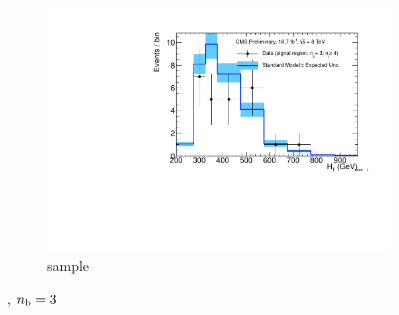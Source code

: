 \begin{figure}[h!]
\begin{subfigure}[b]{0.48\textwidth}
    \includegraphics[width=\textwidth,page=4]
    {Figs/results/v0/blueBand/bestFit_2012dev_RQcdZero_fZinvAll_3b_ge4j-1h_smOnly}
    \caption{\mj sample}
  \end{subfigure}
  \caption{\njhigh, $n_{\text{b}} = 3$}
  \label{fig:blue_fits_3b_ge4j}
\end{figure}


